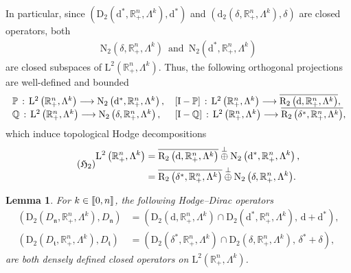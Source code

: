 \documentclass[10pt]{amsart}
\newtheorem{lemm}[theo]{Lemma}\newtheorem{prop}[theo]{Proposition}\newtheorem{coro}[theo]{Corollary}\newtheorem{conj}[theo]{Conjecture}
\theoremstyle{definition}\newtheorem{defi}[theo]{Definition}\newtheorem{rema}[theo]{Remark}\newtheorem{exam}[theo]{Example}\newtheorem{exem}[theo]{Example}\newtheorem{nota}[theo]{Notation}
\newcommand{\bbP}{\mathbb{P}}
\newcommand{\bbR}{\mathbb{R}}
\newcommand{\bbQ}{\mathbb{Q}}
\newcommand{\rmd}{\mathrm{d}}
\newcommand{\rmD}{\mathrm{D}}
\newcommand{\rmL}{\mathrm{L}}
\newcommand{\rmR}{\mathrm{R}}
\newcommand{\rmN}{\mathrm{N}}
\newcommand{\rmI}{\mathrm{I}}
\newcommand{\fkn}{\mathfrak{n}}
\newcommand{\fkt}{\mathfrak{t}}
\newcommand{\llbracket}{\mathopen{[\mkern -2.7mu[}}
\newcommand{\rrbracket}{\mathclose{]\mkern -2.7mu]}}
\newcommand{\llb}{\llbracket}
\newcommand{\rrb}{\rrbracket}
\begin{document}
In particular, since $(\rmD_2(\rmd^\ast,\bbR^n_+,\Lambda^{k}),\rmd^\ast)$ and $(\rmd_2(\delta,\bbR^n_+,\Lambda^{k}),\delta)$ are closed operators, both
\begin{align*}
\rmN_2\left(\delta,\bbR^n_+,\Lambda^{k}\right) \,\text{ and }\,\rmN_2\left(\rmd^\ast,\bbR^n_+,\Lambda^{k}\right)
\end{align*}
are closed subspaces of $\rmL^2(\bbR^n_+,\Lambda^{k})$. Thus, the following orthogonal projections are well-defined and bounded
\begin{align*}
\mkern-15mu\begin{array}{cll}
&\bbP\,:\,\rmL^2\left(\bbR^n_+,\Lambda^{k}\right)\longrightarrow \rmN_2\left(\rmd^\ast,\bbR^n_+,\Lambda^{k}\right),\,& [\rmI -\bbP]\,:\,\rmL^2\left(\bbR^n_+,\Lambda^{k}\right)\longrightarrow \overline{\rmR _2\left(\rmd,\bbR^n_+,\Lambda^{k}\right)},\\
&\bbQ\,:\,\rmL^2\left(\bbR^n_+,\Lambda^{k}\right)\longrightarrow \rmN_2\left(\delta,\bbR^n_+,\Lambda^{k}\right),\,& [\rmI -\bbQ]\,:\,\rmL^2\left(\bbR^n_+,\Lambda^{k}\right)\longrightarrow \overline{\rmR _2\left(\delta^\ast,\bbR^n_+,\Lambda^{k}\right)},
\end{array}
\end{align*}
which induce topological Hodge decompositions
\begin{equation}\label{HodgeDecompL2}
\tag{$\mathfrak{H}_2$}
\begin{split}
\rmL^{2}\left(\bbR^n_+,\Lambda^k\right) &= \overline{\rmR _2\left(\rmd,\bbR^n_+,\Lambda^k\right)}\overset{\perp}{\oplus} \rmN_2\left(\rmd^\ast,\bbR^n_+,\Lambda^k\right),\\
&= \overline{\rmR_2\left(\delta^\ast,\bbR^n_+,\Lambda^k\right)} \overset{\perp}{\oplus} {\rmN_2\left(\delta,\bbR^n_+,\Lambda^k\right)} .
\end{split}
\end{equation}


\begin{lemm}
For $k\in\llb0,n\rrb$, the following Hodge--Dirac operators
\begin{align*}
\left(\rmD_2\left(D_{\fkn},\bbR^n_+,\Lambda^k\right),D_{\fkn}\right)&= \left(\rmD_2\left({\rmd},\bbR^n_+,\Lambda^k\right)\cap\rmD_2\left({\rmd^\ast},\bbR^n_+,\Lambda^k\right),\, \rmd+\rmd^\ast\right),\\
\left(\rmD_2\left(D_{\fkt},\bbR^n_+,\Lambda^k\right),D_{\fkt}\right)&= \left(\rmD_2\left({\delta^\ast},\bbR^n_+,\Lambda^k\right)\cap\rmD_2\left({\delta},\bbR^n_+,\Lambda^k\right),\, \delta^\ast+\delta\right),
\end{align*}
are both densely defined closed operators on $\rmL^2(\bbR^n_+,\Lambda^k)$.
\end{lemm}
\end{document}

